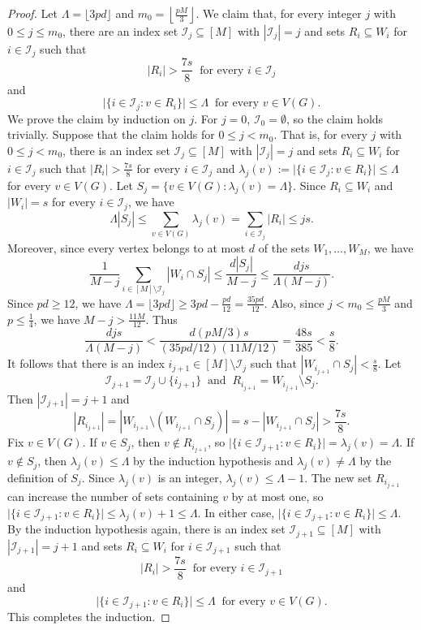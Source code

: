 \documentclass[11pt,a4paper]{article}
\theoremstyle{definition}
\theoremstyle{remark}
\begin{document}
\begin{proof}

Let $\Lambda=\lfloor3pd\rfloor$ and
$m_0=\left\lfloor\frac{pM}{3}\right\rfloor$.
We claim that, for every integer $j$ with $0\le j\le m_0$,
there are an index set $\mathcal I_j\subseteq[M]$ with
$|\mathcal I_j|=j$ and sets $R_i\subseteq W_i$ for
$i\in\mathcal I_j$ such that
\[
 |R_i|>\frac{7s}{8}
 \ \text{ for every }i\in\mathcal I_j
\]
and
\[
 \bigl|\{i\in\mathcal I_j:v\in R_i\}\bigr|\le\Lambda
\ \text{ for every }v\in V(G).
\]
We prove the claim by induction on $j$.
For $j=0$, $\mathcal I_0=\emptyset$, so the claim holds trivially. Suppose that  the claim holds 
for $0\le j<m_0$. That is, for every $j$ with  $0\le j<m_0$, there
is an index set $\mathcal I_j\subseteq[M]$ with 
$|\mathcal I_j|=j$ and sets $R_i\subseteq W_i$ for
$i\in\mathcal I_j$ such that 
 $|R_i|>\frac{7s}{8}$ 
for every $i\in\mathcal I_j$ and 
$\lambda_j(v):=\bigl|\{i\in\mathcal I_j:v\in R_i\}\bigr|\le\Lambda$ for every $v\in V(G)$. 
Let $S_j=\{v\in V(G):\lambda_j(v)=\Lambda\}$.
Since $R_i\subseteq W_i$ and $|W_i|=s$ for every
$i\in\mathcal I_j$, we have
\[
 \Lambda|S_j|
 \le\sum_{v\in V(G)}\lambda_j(v)
 =\sum_{i\in\mathcal I_j}|R_i|
 \le js.
\]
Moreover, since every vertex belongs to at most $d$ of the sets $W_1,\ldots,W_M$, we have
\[
 \frac{1}{M-j}
 \sum_{i\in[M]\setminus\mathcal I_j}|W_i\cap S_j|
 \le\frac{d|S_j|}{M-j}
 \le\frac{djs}{\Lambda(M-j)}.
\]
Since $pd\ge12$, we have
$\Lambda=\lfloor 3pd\rfloor\ge3pd-\frac{pd}{12}=\frac{35pd}{12}$.
Also, since $j<m_0\le\frac{pM}{3}$ and $p\le\frac14$, we have
$M-j>\frac{11M}{12}$. Thus
\[
 \frac{djs}{\Lambda(M-j)}
 <\frac{d(pM/3)s}{(35pd/12)(11M/12)}
 =\frac{48s}{385}<\frac{s}{8}.
\]
It follows that there is an index $i_{j+1}\in[M]\setminus\mathcal I_j$ such that
$|W_{i_{j+1}}\cap S_j|<\frac{s}{8}$.
Let 
\[
 \mathcal I_{j+1}=\mathcal I_j\cup\{i_{j+1}\} \ 
\text{ and } \ 
 R_{i_{j+1}}=W_{i_{j+1}}\setminus S_j.
\]
Then $|\mathcal I_{j+1}|=j+1$ and 
\[
 |R_{i_{j+1}}|=|W_{i_{j+1}}\setminus (W_{i_{j+1}}\cap S_j)|
 =s-|W_{i_{j+1}}\cap S_j|
 >\frac{7s}{8}.
\]
Fix $v\in V(G)$.
If $v\in S_j$, then $v\notin R_{i_{j+1}}$, so
$\bigl|\{i\in\mathcal I_{j+1}:v\in R_i\}\bigr|
 =\lambda_j(v)=\Lambda$.
If $v\notin S_j$, then $\lambda_j(v)\le\Lambda$ by the
induction hypothesis and $\lambda_j(v)\ne\Lambda$ by the
definition of $S_j$. Since $\lambda_j(v)$ is an integer,
$\lambda_j(v)\le\Lambda-1$. The new set $R_{i_{j+1}}$
can increase the number of sets containing $v$ by at most one,
so
$\bigl|\{i\in\mathcal I_{j+1}:v\in R_i\}\bigr|
 \le\lambda_j(v)+1\le\Lambda$. 
In either case,  $\bigl|\{i\in\mathcal I_{j+1}:v\in R_i\}\bigr|\le\Lambda$.
By the induction hypothesis again, there is an index set $\mathcal I_{j+1}\subseteq[M]$ with
$|\mathcal I_{j+1}|=j+1$ and sets $R_i\subseteq W_i$ for
$i\in\mathcal I_{j+1}$ such that
\[
 |R_i|>\frac{7s}{8}
 \ \text{ for every }i\in\mathcal I_{j+1}
\]
and
\[
 \bigl|\{i\in\mathcal I_{j+1}:v\in R_i\}\bigr|\le\Lambda
\ \text{ for every }v\in V(G).
\]
This completes the induction.


\end{proof}
\end{document}
